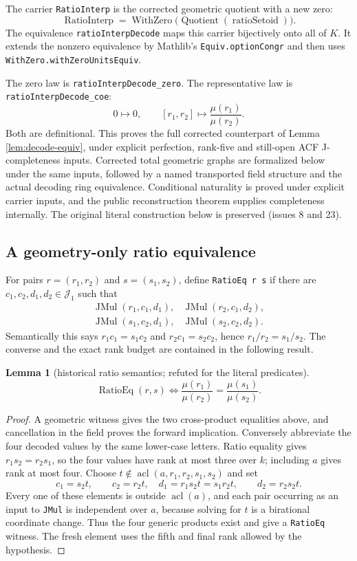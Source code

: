 \documentclass[11pt,oneside]{article}
\newtheorem{lemma}[theorem]{Lemma}
\theoremstyle{definition}
\theoremstyle{remark}
\newcommand{\acl}{\operatorname{acl}}
\newcommand{\Jrel}{\mathcal{J}}
\newcommand{\lean}[1]{\nolinkurl{#1}}
\begin{document}
The carrier \lean{RatioInterp} is the corrected geometric quotient with a new zero:
\[
 \operatorname{RatioInterp}=\operatorname{WithZero}
       \bigl(\operatorname{Quotient}(\operatorname{ratioSetoid})\bigr).
\]
The equivalence \lean{ratioInterpDecode} maps this carrier bijectively onto all of $K$.
It extends the nonzero equivalence by Mathlib's \lean{Equiv.optionCongr} and then
uses \lean{WithZero.withZeroUnitsEquiv}.

The zero law is \lean{ratioInterpDecode_zero}.
The representative law is \lean{ratioInterpDecode_coe}:
\[
 0\longmapsto0,\qquad [r_1,r_2]\longmapsto\frac{\mu(r_1)}{\mu(r_2)}.
\]
Both are definitional. This proves the full corrected counterpart of
Lemma \ref{lem:decode-equiv}, under explicit perfection, rank-five and still-open
ACF J-completeness inputs. Corrected total geometric graphs are formalized below
under the same inputs, followed by a named transported field structure and the actual decoding
ring equivalence. Conditional naturality is proved under explicit carrier inputs, and the
public reconstruction theorem supplies completeness internally. The original literal
construction below is preserved (issues 8 and 23).

\subsection{A geometry-only ratio equivalence}

For pairs $r=(r_1,r_2)$ and $s=(s_1,s_2)$, define
\lean{RatioEq r s} if there are $c_1,c_2,d_1,d_2\in\Jrel_1$ such that
\[
\begin{array}{ll}
\operatorname{JMul}(r_1,c_1,d_1),&
\operatorname{JMul}(r_2,c_1,d_2),\\
\operatorname{JMul}(s_1,c_2,d_1),&
\operatorname{JMul}(s_2,c_2,d_2).
\end{array}
\]
Semantically this says
$r_1c_1=s_1c_2$ and $r_2c_1=s_2c_2$, hence $r_1/r_2=s_1/s_2$.
The converse and the exact rank budget are contained in the following result.

\begin{lemma}[historical ratio semantics; refuted for the literal predicates]\label{lem:ratio-semantics}
\[
 \operatorname{RatioEq}(r,s)
 \Longleftrightarrow
 \frac{\mu(r_1)}{\mu(r_2)}=\frac{\mu(s_1)}{\mu(s_2)}.
\]
\end{lemma}
\begin{proof}
A geometric witness gives the two cross-product equalities above, and cancellation in the
field proves the forward implication.  Conversely abbreviate the four decoded values by
the same lower-case letters.  Ratio equality gives
$r_1s_2=r_2s_1$, so the four values have rank at most three over $k$; including $a$ gives
rank at most four.  Choose $t\notin\acl(a,r_1,r_2,s_1,s_2)$ and set
\[
 c_1=s_2t,\qquad c_2=r_2t,
 \quad d_1=r_1s_2t=s_1r_2t,\qquad d_2=r_2s_2t.
\]
Every one of these elements is outside $\acl(a)$, and each pair occurring as an input to
\lean{JMul} is independent over $a$, because solving for $t$ is a birational coordinate
change.  Thus the four generic products exist and give a \lean{RatioEq} witness.  The
fresh element uses the fifth and final rank allowed by the hypothesis.
\end{proof}
\end{document}
